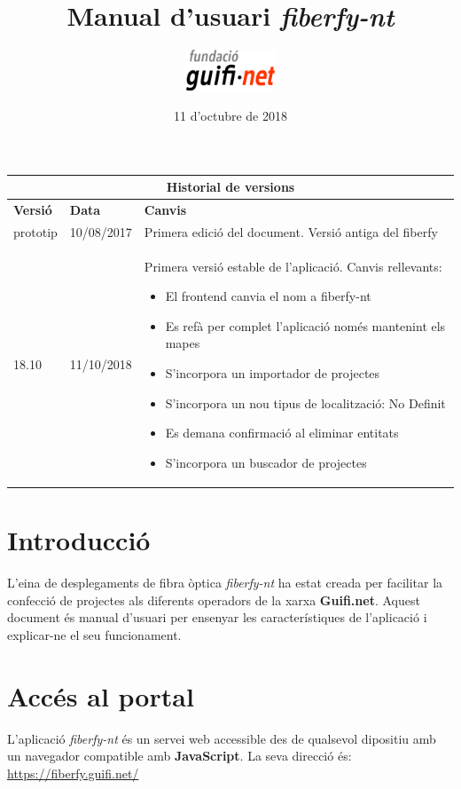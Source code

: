 \documentclass[a4paper]{article}
\author{\includegraphics[width=0.2\textwidth]{images/logo_fundacio.png}
}
\title{\textbf{Manual d'usuari \emph{fiberfy-nt}}}
\date{11 d'octubre de 2018}
\begin{document}
	\maketitle
	\newpage
	
	\begin{center}
		\begin{tabular}{| p{1.89cm} | p{2.21cm} | p{8.42cm} |} \hline
			\multicolumn{3}{|c|}{\large{\textbf{Historial de versions}}} \\ \hline
			\textbf{Versió} & \textbf{Data} & \textbf{Canvis} \\ \hline
			prototip & 10/08/2017 & Primera edició del document. Versió antiga del fiberfy \\ \hline
			18.10 & 11/10/2018 & Primera versió estable de l'aplicació. Canvis rellevants:
			\begin{itemize}
				\item El frontend canvia el nom a fiberfy-nt
				\item Es refà per complet l'aplicació només mantenint els mapes
				\item S'incorpora un importador de projectes
				\item S'incorpora un nou tipus de localització: No Definit
				\item Es demana confirmació al eliminar entitats
				\item S'incorpora un buscador de projectes
			\end{itemize} \\ \hline
		\end{tabular}
	\end{center}
	\newpage
	\tableofcontents
	\newpage
	\onehalfspacing
	
	\section{Introducció}
	L'eina de desplegaments de fibra òptica \emph{fiberfy-nt} ha estat creada per facilitar la confecció de projectes als diferents operadors de la xarxa \textbf{Guifi.net}.
	Aquest document és manual d'usuari per ensenyar les característiques de l'aplicació i explicar-ne el seu funcionament. 
	
	\section{Accés al portal}
	L'aplicació \emph{fiberfy-nt} és un servei web accessible des de qualsevol dipositiu amb un navegador compatible amb \textbf{JavaScript}. La seva direcció és: \url{https://fiberfy.guifi.net/}
	
\end{document}
